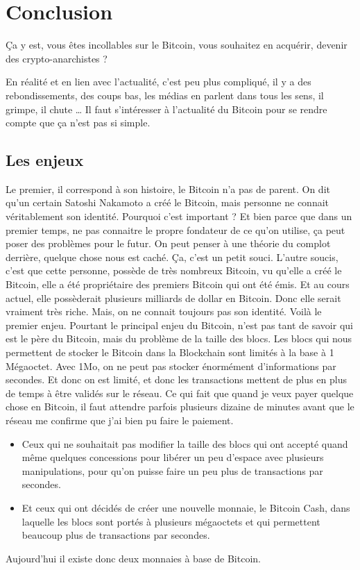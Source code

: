 \documentclass{bredele} %
\begin{document}
    \chapter{Conclusion}
    Ça y est, vous êtes incollables sur le Bitcoin, vous souhaitez en acquérir, devenir des crypto-anarchistes ?
    \newline

    En réalité et en lien avec l’actualité, c’est peu plus compliqué, il y a des rebondissements, des coups bas, les médias en parlent dans tous les sens, il grimpe, il chute …
    \newline
    Il faut s’intéresser à l’actualité du Bitcoin pour se rendre compte que ça n’est pas si simple.
    \section*{Les enjeux}
    Le premier, il correspond à son histoire, le Bitcoin n’a pas de parent. On dit qu’un certain Satoshi Nakamoto a créé le Bitcoin, mais personne ne connait véritablement son identité. Pourquoi c’est important ? Et bien parce que dans un premier temps, ne pas connaitre le propre fondateur de ce qu’on utilise, ça peut poser des problèmes pour le futur. On peut penser à une théorie du complot derrière, quelque chose nous est caché.
    \newline
    Ça, c’est un petit souci. L’autre soucis, c’est que cette personne, possède de très nombreux Bitcoin, vu qu’elle a créé le Bitcoin, elle a été propriétaire des premiers Bitcoin qui ont été émis. Et au cours actuel, elle possèderait plusieurs milliards de dollar en Bitcoin. Donc elle serait vraiment très riche. Mais, on ne connait toujours pas son identité. Voilà le premier enjeu.
    \newline
    \newline
    Pourtant le principal enjeu du Bitcoin, n’est pas tant de savoir qui est le père du Bitcoin, mais du problème de la taille des blocs. Les blocs qui nous permettent de stocker le Bitcoin dans la Blockchain sont limités à la base à 1 Mégaoctet. Avec 1Mo, on ne peut pas stocker énormément d’informations par secondes. Et donc on est limité, et donc les transactions mettent de plus en plus de temps à être validés sur le réseau. Ce qui fait que quand je veux payer quelque chose en Bitcoin, il faut attendre parfois plusieurs dizaine de minutes avant que le réseau me confirme que j’ai bien pu faire le paiement.
    \begin{itemize}
        \item Ceux qui ne souhaitait pas modifier la taille des blocs qui ont accepté quand même quelques concessions pour libérer un peu d’espace avec plusieurs manipulations, pour qu’on puisse faire un peu plus de transactions par secondes.
        \item Et ceux qui ont décidés de créer une nouvelle monnaie, le Bitcoin Cash, dans laquelle les blocs sont portés à plusieurs mégaoctets et qui permettent beaucoup plus de transactions par secondes.
    \end{itemize}
    Aujourd’hui il existe donc deux monnaies à base de Bitcoin.
\end{document}

